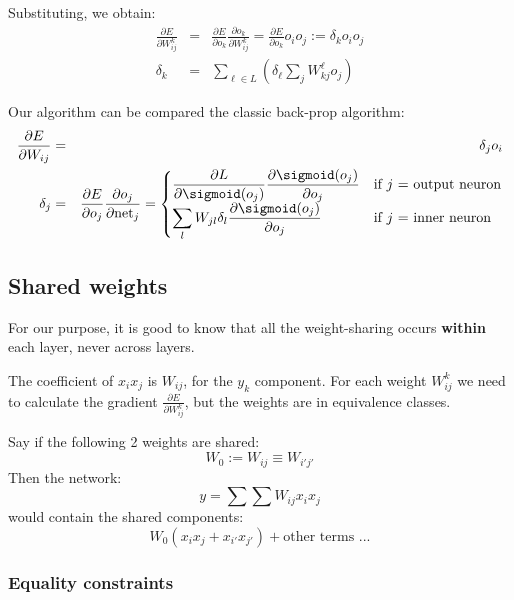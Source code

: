 Substituting, we obtain:
\begin{eqnarray}
\frac{\partial E}{\partial W_{ij}^k}
&=& \frac{\partial E}{\partial o_k} \frac{\partial o_k}{\partial W_{ij}^k}
= \frac{\partial E}{\partial o_k} o_i o_j := \delta_k o_i o_j \nonumber \\ 
\delta_k &=& \sum_{\ell \in L} \left( \delta_{\ell} \sum_j W_{kj}^{\ell} o_j \right)
\end{eqnarray}

Our algorithm can be compared the classic back-prop algorithm:
\begin{eqnarray}
\frac{\partial E}{\partial W_{i j}} &=& \delta_j o_i \nonumber \\
\delta_j &=& \frac{\partial E}{\partial o_j} \frac{\partial o_j}{\partial \mathrm{net}_j} =
	\begin{cases}
	\displaystyle
	\frac{\partial L}{\partial \sigmoid(o_j)} \frac{\partial \sigmoid(o_j)}{\partial o_j} & \text{if $j$ = output neuron} \\
	\displaystyle
	\sum_l W_{j l} \delta_l \frac{\partial \sigmoid(o_j)}{\partial o_j} &  \text{if $j$ = inner neuron} 
	\end{cases}
\end{eqnarray}

\subsection{Shared weights}

For our purpose, it is good to know that all the weight-sharing occurs \textbf{within} each layer, never across layers.

The coefficient of $x_i x_j$ is $W_{i j}$, for the $y_k$ component.  For each weight $W_{ij}^k$ we need to calculate the gradient $\displaystyle \frac{\partial E}{\partial W_{ij}^k}$, but the weights are in equivalence classes.

Say if the following 2 weights are shared:
\begin{equation}
W_0 := W_{i j} \equiv W_{i' j'}
\end{equation}
Then the network:
\begin{equation}
y = \sum \sum W_{ij} x_i x_j
\end{equation}
would contain the shared components:
\begin{equation}
W_0 ( x_i x_j + x_{i'} x_{j'} ) + \mbox{other terms ...}
\end{equation}

\subsubsection{Equality constraints}


